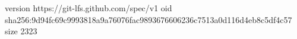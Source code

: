 version https://git-lfs.github.com/spec/v1
oid sha256:9d94fc69c9993818a9a76076fac9893676606236c7513a0d116d4eb8c5df4c57
size 2323
